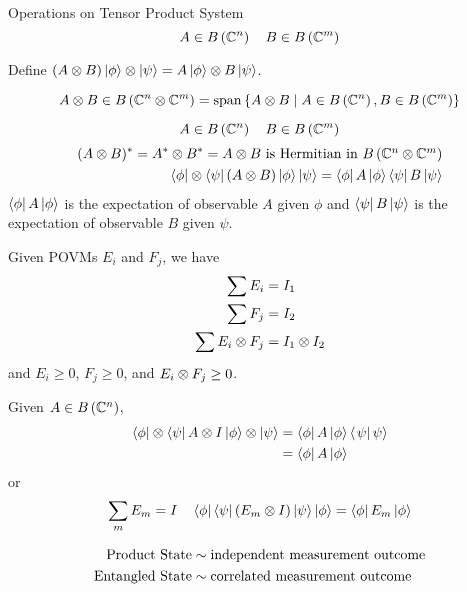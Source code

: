Operations on Tensor Product System
\[A \in B\left(\mathbb{C}^n\right) \quad B\in B\left(\mathbb{C}^m\right)\]

Define $(A\otimes B)\left|\phi\right\rangle\otimes\left|\psi\right\rangle = A\left|\phi\right\rangle\otimes B\left|\psi\right\rangle$.

\[A \otimes B \in B\left(\mathbb{C}^n \otimes \mathbb{C}^m\right) = \operatorname{span}\left\lbrace A \otimes B \mid A \in B\left(\mathbb{C}^n\right), B\in B\left(\mathbb{C}^m\right)\right\rbrace\]

\begin{definition}
    \[A \in B\left(\mathbb{C}^n\right) \quad B\in B\left(\mathbb{C}^m\right)\]
    \begin{align*}
        (A \otimes B)^* = A^* \otimes B^* = A \otimes B\hbox{ is Hermitian in $B\left(\mathbb{C}^n \otimes \mathbb{C}^m\right)$} \\
        \left\langle \phi\right|\otimes \left\langle \psi\right|\left(A \otimes B\right)\left|\phi\right\rangle\left|\psi\right\rangle = \left\langle \phi\right|A\left|\phi\right\rangle \left\langle \psi\right|B\left|\psi\right\rangle
    \end{align*}
    $\left\langle \phi\right|A\left|\phi\right\rangle$ is the expectation of observable $A$ given $\phi$ and
    $\left\langle \psi\right|B\left|\psi\right\rangle$ is the expectation of observable $B$ given $\psi$.
\end{definition}

Given POVMs $E_i$ and $F_j$, we have
\begin{align*}
    \sum E_i                 & = I_1                 \\
    \sum F_j                 & = I_2                 \\
    \sum E_i \otimes F_j & = I_1 \otimes I_2
\end{align*}
and $E_i \geq 0$, $F_j \geq 0$, and $E_i \otimes F_j \geq 0$.

\begin{definition}
    Given $A \in B\left(\mathbb{C}^n\right)$,
    \begin{align*}\left\langle \phi\right|\otimes\left\langle \psi\right| A \otimes I \left|\phi\right\rangle\otimes\left|\psi\right\rangle
         & = \left\langle \phi\right|A\left|\phi\right\rangle\left\langle \left.\psi\right|\psi\right\rangle \\
         & = \left\langle \phi\right|A\left|\phi\right\rangle
    \end{align*}
    or
    \[\sum_m E_m = I \quad \left\langle \phi\right|\left\langle \psi\right|(E_m \otimes I)\left|\psi\right\rangle\left|\phi\right\rangle = \left\langle \phi\right|E_m\left|\phi\right\rangle\]
\end{definition}

\begin{align*}
    \hbox{Product State}   & \sim \hbox{independent measurement outcome} \\
    \hbox{Entangled State} & \sim \hbox{correlated measurement outcome}
\end{align*}

